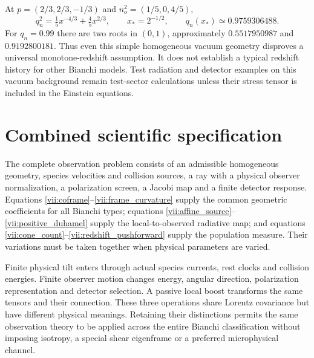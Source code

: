 At $p=(2/3,2/3,-1/3)$ and $n_o^2=(1/5,0,4/5)$,
\begin{equation}\label{vii:kasner_fold}
q_n^2=\tfrac15x^{-4/3}+\tfrac45x^{2/3},\qquad x_*\!=2^{-1/2},\qquad q_n(x_*)\simeq0.9759306488.
\end{equation}
For $q_n=0.99$ there are two roots in $(0,1)$, approximately $0.5517950987$ and $0.9192800181$. Thus even this simple homogeneous vacuum geometry disproves a universal monotone-redshift assumption. It does not establish a typical redshift history for other Bianchi models. Test radiation and detector examples on this vacuum background remain test-sector calculations unless their stress tensor is included in the Einstein equations.

\section{Combined scientific specification}
The complete observation problem consists of an admissible homogeneous geometry, species velocities and collision sources, a ray with a physical observer normalization, a polarization screen, a Jacobi map and a finite detector response. Equations \eqref{vii:coframe}--\eqref{vii:frame_curvature} supply the common geometric coefficients for all Bianchi types; equations \eqref{vii:affine_source}--\eqref{vii:positive_duhamel} supply the local-to-observed radiative map; and equations \eqref{vii:cone_count}--\eqref{vii:redshift_pushforward} supply the population measure. Their variations must be taken together when physical parameters are varied.

Finite physical tilt enters through actual species currents, rest clocks and collision energies. Finite observer motion changes energy, angular direction, polarization representation and detector selection. A passive local boost transforms the same tensors and their connection. These three operations share Lorentz covariance but have different physical meanings. Retaining their distinctions permits the same observation theory to be applied across the entire Bianchi classification without imposing isotropy, a special shear eigenframe or a preferred microphysical channel.
